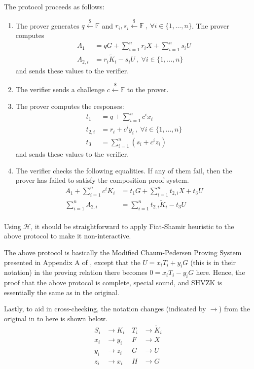 \documentclass{article}
\begin{document}
The protocol proceeds as follows:
\begin{enumerate}
\item The prover generates $q\xleftarrow{\$}\mathbb{F}$ and $r_i, s_i \xleftarrow{\$}\mathbb{F}\ ,\ \forall i\in\{1,\ldots,n\}$. The prover computes
\begin{align*}
A_1 &= qG + \sum_{i=1}^n{r_i X} + \sum_{i=1}^n{s_i U} \\
A_{2,i} &= r_i \tilde{K}_i - s_i U\ ,\ \forall i\in\{1,\ldots,n\}
\end{align*}
and sends these values to the verifier.
\item The verifier sends a challenge $c\xleftarrow{\$}\mathbb{F}$ to the prover.
\item The prover computes the responses:
\begin{align*}
t_1 &= q + \sum_{i=1}^n c^i x_i \\
t_{2,i} &= r_i + c^i y_i\ ,\ \forall i\in\{1,\ldots,n\} \\
t_3 &= \sum_{i=1}^n (s_i + c^i z_i)
\end{align*}
and sends these values to the verifier.
\item The verifier checks the following equalities. If any of them fail, then the prover has failed to satisfy the composition proof system.
\begin{align*}
A_1 + \sum_{i=1}^{n}{c^i K_i} &= t_1 G + \sum_{i=1}^n{t_{2,i} X} + t_3 U \\
\sum_{i=1}^{n} A_{2,i} &= \sum_{i=1}^{n} t_{2,i}\tilde{K}_i - t_3 U \\
\end{align*}
\end{enumerate}
Using $\mathcal{H}$, it should be straightforward to apply Fiat-Shamir heuristic \cite{fiat-shamir} to the above protocol to make it non-interactive.

The above protocol is basically the Modified Chaum-Pedersen Proving System presented in Appendix A of \cite{lelantus-spark}, except that the $U = x_i T_i + y_i G$ (this is in their notation) in the proving relation there becomes $0 = x_i T_i - y_i G$ here. Hence, the proof that the above protocol is complete, special sound, and SHVZK is essentially the same as in the original.

Lastly, to aid in cross-checking, the notation changes (indicated by $\rightarrow$) from the original in \cite{lelantus-spark} to here is shown below.
\begin{align*}
S_i &\rightarrow K_i&\ T_i &\rightarrow \tilde{K}_i \\
x_i &\rightarrow y_i&\ F &\rightarrow X \\
y_i &\rightarrow z_i&\ G &\rightarrow U \\
z_i &\rightarrow x_i&\ H &\rightarrow G
\end{align*}


\end{document}
